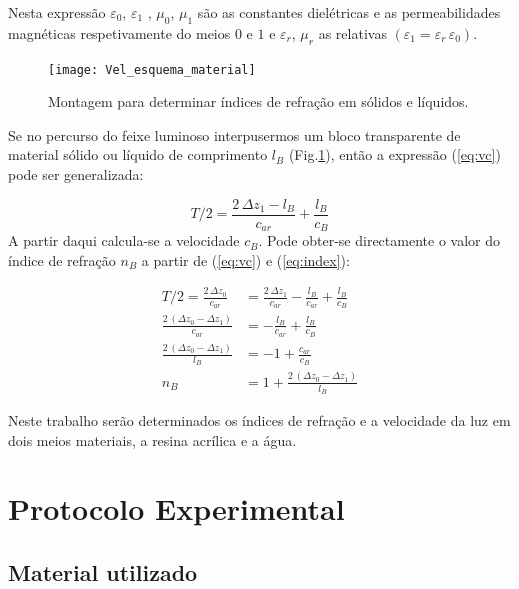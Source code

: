 \documentclass[a4paper,12pt]{article}      %
\begin{document}
Nesta expressão $\varepsilon_0$, $\varepsilon_1$ ,	 $\mu_0$, $\mu_1$ são as constantes dielétricas e as permeabilidades magnéticas respetivamente do meios $0$ e $1$ e $\varepsilon_r$, $\mu_r$    as relativas $(\varepsilon_1= \varepsilon_r\, \varepsilon_0)$.

\begin{figure}[h!tb]  
	\centering 
	\texttt{[image: Vel\_esquema\_material]}
	\caption{Montagem para determinar índices de refração em sólidos e líquidos. \label{fig:Montagem_bloco}} 
\end{figure}

Se no percurso do feixe luminoso interpusermos um bloco transparente de material sólido ou líquido  
 de comprimento $l_B$ (Fig.\ref{fig:Montagem_bloco}), então a expressão  (\ref{eq:vc}) pode ser generalizada:

\begin{equation}
	\label{eq:vc_bloco}
	{T/2}  = \frac{2\,\Delta z_1 - l_B}{c_{ar}}  +  \frac{l_B}{c_{B}}
\end{equation}
A partir daqui calcula-se a velocidade $c_{B}$.  Pode obter-se directamente o valor do índice de refração $n_{B}$ a partir de (\ref{eq:vc}) e (\ref{eq:index}):

\begin{align}
	\label{eq:n_bloco}
	{T/2}  = \frac{2\,\Delta z_0}{c_{ar}}  &=  \frac{2\,\Delta z_1 }{c_{ar}} -   \frac{l_B}{c_{ar}}  +  \frac{l_B}{c_{B}} \nonumber \\ 
	\frac{2\,(\Delta z_0- \Delta z_1 )}{c_{ar}}  &= -   \frac{l_B}{c_{ar}}  +  \frac{l_B}{c_{B}} \nonumber \\
	\frac{2\,(\Delta z_0- \Delta z_1 )}{l_B} &= -1 +  \frac{c_{ar}}{c_{B}} \nonumber \\
	n_{B} &= 1 +  \frac{2\,(\Delta z_0- \Delta z_1 )}{l_B} 
\end{align}

 Neste trabalho serão  determinados os índices de refração e a velocidade da
luz em  dois meios materiais, a resina acrílica e a água. 
 


\newpage
\section{\sf Protocolo Experimental}
\subsection{\sf Material utilizado}
\end{document}

